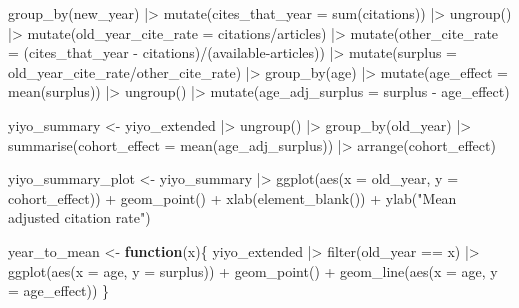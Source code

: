 \documentclass[
  10pt,
  letterpaper,
  DIV=11,
  numbers=noendperiod,
  twoside]{scrartcl}
\newenvironment{Shaded}{\begin{snugshade}}{\end{snugshade}}
\newcommand{\AttributeTok}[1]{\textcolor[rgb]{0.40,0.45,0.13}{#1}}
\newcommand{\ControlFlowTok}[1]{\textcolor[rgb]{0.00,0.23,0.31}{\textbf{#1}}}
\newcommand{\FunctionTok}[1]{\textcolor[rgb]{0.28,0.35,0.67}{#1}}
\newcommand{\NormalTok}[1]{\textcolor[rgb]{0.00,0.23,0.31}{#1}}
\newcommand{\OtherTok}[1]{\textcolor[rgb]{0.00,0.23,0.31}{#1}}
\newcommand{\SpecialCharTok}[1]{\textcolor[rgb]{0.37,0.37,0.37}{#1}}
\newcommand{\StringTok}[1]{\textcolor[rgb]{0.13,0.47,0.30}{#1}}
\begin{document}
\begin{Shaded}
\begin{Highlighting}[]
  \FunctionTok{group\_by}\NormalTok{(new\_year) }\SpecialCharTok{|\textgreater{}}
  \FunctionTok{mutate}\NormalTok{(}\AttributeTok{cites\_that\_year =} \FunctionTok{sum}\NormalTok{(citations)) }\SpecialCharTok{|\textgreater{}}
  \FunctionTok{ungroup}\NormalTok{() }\SpecialCharTok{|\textgreater{}}
  \FunctionTok{mutate}\NormalTok{(}\AttributeTok{old\_year\_cite\_rate =}\NormalTok{ citations}\SpecialCharTok{/}\NormalTok{articles) }\SpecialCharTok{|\textgreater{}}
  \FunctionTok{mutate}\NormalTok{(}\AttributeTok{other\_cite\_rate =}\NormalTok{ (cites\_that\_year }\SpecialCharTok{{-}}\NormalTok{ citations)}\SpecialCharTok{/}\NormalTok{(available}\SpecialCharTok{{-}}\NormalTok{articles)) }\SpecialCharTok{|\textgreater{}}
  \FunctionTok{mutate}\NormalTok{(}\AttributeTok{surplus =}\NormalTok{ old\_year\_cite\_rate}\SpecialCharTok{/}\NormalTok{other\_cite\_rate) }\SpecialCharTok{|\textgreater{}}
  \FunctionTok{group\_by}\NormalTok{(age) }\SpecialCharTok{|\textgreater{}}
  \FunctionTok{mutate}\NormalTok{(}\AttributeTok{age\_effect =} \FunctionTok{mean}\NormalTok{(surplus)) }\SpecialCharTok{|\textgreater{}}
  \FunctionTok{ungroup}\NormalTok{() }\SpecialCharTok{|\textgreater{}}
  \FunctionTok{mutate}\NormalTok{(}\AttributeTok{age\_adj\_surplus =}\NormalTok{ surplus }\SpecialCharTok{{-}}\NormalTok{ age\_effect)}
  
\NormalTok{yiyo\_summary }\OtherTok{\textless{}{-}}\NormalTok{ yiyo\_extended }\SpecialCharTok{|\textgreater{}}
  \FunctionTok{ungroup}\NormalTok{() }\SpecialCharTok{|\textgreater{}}
  \FunctionTok{group\_by}\NormalTok{(old\_year) }\SpecialCharTok{|\textgreater{}}
  \FunctionTok{summarise}\NormalTok{(}\AttributeTok{cohort\_effect =} \FunctionTok{mean}\NormalTok{(age\_adj\_surplus)) }\SpecialCharTok{|\textgreater{}}
  \FunctionTok{arrange}\NormalTok{(cohort\_effect)}

\NormalTok{yiyo\_summary\_plot }\OtherTok{\textless{}{-}}\NormalTok{ yiyo\_summary }\SpecialCharTok{|\textgreater{}} 
    \FunctionTok{ggplot}\NormalTok{(}\FunctionTok{aes}\NormalTok{(}\AttributeTok{x =}\NormalTok{ old\_year, }\AttributeTok{y =}\NormalTok{ cohort\_effect)) }\SpecialCharTok{+} 
    \FunctionTok{geom\_point}\NormalTok{() }\SpecialCharTok{+}
    \FunctionTok{xlab}\NormalTok{(}\FunctionTok{element\_blank}\NormalTok{()) }\SpecialCharTok{+}
    \FunctionTok{ylab}\NormalTok{(}\StringTok{"Mean adjusted citation rate"}\NormalTok{)}

\NormalTok{year\_to\_mean }\OtherTok{\textless{}{-}} \ControlFlowTok{function}\NormalTok{(x)\{}
\NormalTok{  yiyo\_extended }\SpecialCharTok{|\textgreater{}}
    \FunctionTok{filter}\NormalTok{(old\_year }\SpecialCharTok{==}\NormalTok{ x) }\SpecialCharTok{|\textgreater{}}
    \FunctionTok{ggplot}\NormalTok{(}\FunctionTok{aes}\NormalTok{(}\AttributeTok{x =}\NormalTok{ age, }\AttributeTok{y =}\NormalTok{ surplus)) }\SpecialCharTok{+} 
    \FunctionTok{geom\_point}\NormalTok{() }\SpecialCharTok{+}
    \FunctionTok{geom\_line}\NormalTok{(}\FunctionTok{aes}\NormalTok{(}\AttributeTok{x =}\NormalTok{ age, }\AttributeTok{y =}\NormalTok{ age\_effect))}
\NormalTok{\}}
\end{Highlighting}
\end{Shaded}
\end{document}
